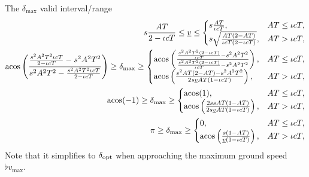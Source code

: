 The $\delta_{\max}$ valid interval/range
\begin{align*}
s \frac{AT}{2 - \iota cT} \le \flat{v} \le
\begin{cases}
s \frac{AT}{\iota cT}, & AT \le \iota cT,\\
s \sqrt{\frac{AT(2 - AT)}{\iota cT(2 - \iota cT)}}, &AT > \iota cT,
\end{cases}\\
\acos\left( \frac{\frac{s^2A^2T^2\iota cT}{2 - \iota cT} - s^2A^2T^2}{s^2A^2T^2 - \frac{s^2A^2T^2\iota cT}{2 - \iota cT}} \right) \ge \delta_{\max} \ge
\begin{cases}
\acos\left( \frac{\frac{s^2A^2T^2(2 - \iota cT)}{\iota cT} - s^2A^2T^2}{\frac{s^2A^2T^2(2 - \iota cT)}{\iota cT} - s^2A^2T^2} \right), & AT \le \iota cT,\\
\acos\left( \frac{s^2 AT(2 - AT) - s^2 A^2 T^2}{2 s \flat{v} AT(1 - \iota cT)} \right), &AT > \iota cT,
\end{cases}\\
\acos(-1) \ge \delta_{\max} \ge
\begin{cases}
\acos(1), & AT \le \iota cT,\\
\acos\left( \frac{2 s s AT(1 - AT)}{2 s \flat{v} AT(1 - \iota cT)} \right), &AT > \iota cT,
\end{cases}\\
\pi \ge \delta_{\max} \ge
\begin{cases}
0, & AT \le \iota cT,\\
\acos\left( \frac{s(1 - AT)}{\flat{v} (1 - \iota cT)} \right), &AT > \iota cT,
\end{cases}
\end{align*}
Note that it simplifies to $\delta_{\operatorname{opt}}$ when approaching the maximum ground speed $\flat{v}_{\max}$.



